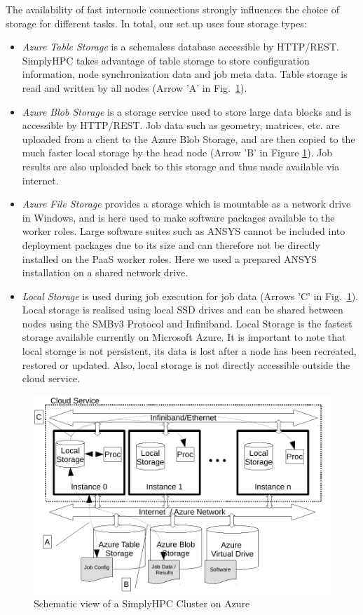 \documentclass[3p,times]{elsarticle}
\begin{document}
The availability of fast internode connections strongly influences the choice of storage for different tasks. In total, our set up uses four storage types:
\begin{itemize}

	\item \textit{Azure Table Storage} is a schemaless database accessible by HTTP/REST. SimplyHPC takes advantage of table storage to store configuration information, node synchronization data and job meta data. Table storage is read and written by all nodes (Arrow 'A' in Fig.~\ref{fig:schemaService}).
	
	\item \textit{Azure Blob Storage} is a storage service used to store large data blocks and is accessible by HTTP/REST. Job data such as geometry, matrices, etc. are uploaded from a client to the Azure Blob Storage, and are then copied to the much faster local storage by the head node (Arrow 'B' in Figure \ref{fig:schemaService}). Job results are also uploaded back to this storage and thus made available via internet.	
	
	\item \textit{Azure File Storage} provides a storage which is mountable as a network drive in Windows, and is here used to make software packages available to the worker roles. Large software suites such as ANSYS cannot be included into deployment packages due to its size and can therefore not be directly installed on the PaaS worker roles. Here we used a prepared ANSYS installation on a shared network drive.
	
	\item \textit{Local Storage} is used during job execution for job data (Arrows 'C' in Fig.~\ref{fig:schemaService}). Local storage is realised using local SSD drives and can be shared between nodes using the SMBv3 Protocol and Infiniband. Local Storage is the fastest storage available currently on Microsoft Azure. It is important to note that local storage is not persistent, its data is lost after a node has been recreated, restored or updated. Also, local storage is not directly accessible outside the cloud service.

\end{itemize}


\begin{figure}[ht]
	\centering
	\includegraphics[width=.6\linewidth]{azureDeployment.pdf}

	\caption{Schematic view of a SimplyHPC Cluster on Azure}	
	\label{fig:schemaService}
\end{figure}
\end{document}
